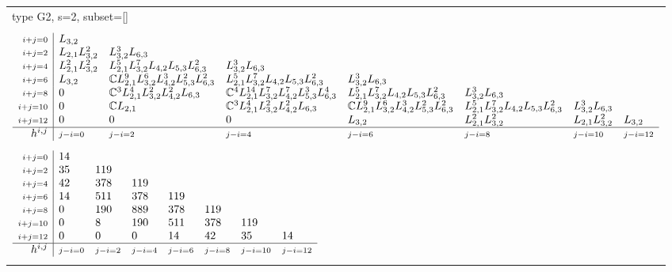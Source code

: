 \documentclass[crop,border=2mm]{standalone}
\begin{document}
\begin{tabular}{l}
{\huge type G2, s=2, subset=[]}\\ \\


$\displaystyle
\begin{array}{r|l l l l l l l}
	{\scriptstyle i+j=0}&L_{3,2}&&&&&&\\
	{\scriptstyle i+j=2}&L_{2,1}L_{3,2}^{2}&L_{3,2}^{3}L_{6,3}&&&&&\\
	{\scriptstyle i+j=4}&L_{2,1}^{2}L_{3,2}^{2}&L_{2,1}^{5}L_{3,2}^{7}L_{4,2}L_{5,3}L_{6,3}^{2}&L_{3,2}^{3}L_{6,3}&&&&\\
	{\scriptstyle i+j=6}&L_{3,2}&\mathbb{C}L_{2,1}^{9}L_{3,2}^{6}L_{4,2}^{3}L_{5,3}^{2}L_{6,3}^{2}&L_{2,1}^{5}L_{3,2}^{7}L_{4,2}L_{5,3}L_{6,3}^{2}&L_{3,2}^{3}L_{6,3}&&&\\
	{\scriptstyle i+j=8}&0&\mathbb{C}^{3}L_{2,1}^{4}L_{3,2}^{2}L_{4,2}^{2}L_{6,3}&\mathbb{C}^{4}L_{2,1}^{14}L_{3,2}^{7}L_{4,2}^{7}L_{5,3}^{3}L_{6,3}^{4}&L_{2,1}^{5}L_{3,2}^{7}L_{4,2}L_{5,3}L_{6,3}^{2}&L_{3,2}^{3}L_{6,3}&&\\
	{\scriptstyle i+j=10}&0&\mathbb{C}L_{2,1}&\mathbb{C}^{3}L_{2,1}^{4}L_{3,2}^{2}L_{4,2}^{2}L_{6,3}&\mathbb{C}L_{2,1}^{9}L_{3,2}^{6}L_{4,2}^{3}L_{5,3}^{2}L_{6,3}^{2}&L_{2,1}^{5}L_{3,2}^{7}L_{4,2}L_{5,3}L_{6,3}^{2}&L_{3,2}^{3}L_{6,3}&\\
	{\scriptstyle i+j=12}&0&0&0&L_{3,2}&L_{2,1}^{2}L_{3,2}^{2}&L_{2,1}L_{3,2}^{2}&L_{3,2}\\
	\hline h^{i,j}&{\scriptstyle j-i=0}&{\scriptstyle j-i=2}&{\scriptstyle j-i=4}&{\scriptstyle j-i=6}&{\scriptstyle j-i=8}&{\scriptstyle j-i=10}&{\scriptstyle j-i=12}
\end{array}
$ \\ \\


$\displaystyle
\begin{array}{r|l l l l l l l}
	{\scriptstyle i+j=0}&14&&&&&&\\
	{\scriptstyle i+j=2}&35&119&&&&&\\
	{\scriptstyle i+j=4}&42&378&119&&&&\\
	{\scriptstyle i+j=6}&14&511&378&119&&&\\
	{\scriptstyle i+j=8}&0&190&889&378&119&&\\
	{\scriptstyle i+j=10}&0&8&190&511&378&119&\\
	{\scriptstyle i+j=12}&0&0&0&14&42&35&14\\
	\hline h^{i,j}&{\scriptstyle j-i=0}&{\scriptstyle j-i=2}&{\scriptstyle j-i=4}&{\scriptstyle j-i=6}&{\scriptstyle j-i=8}&{\scriptstyle j-i=10}&{\scriptstyle j-i=12}
\end{array}
$ \\ \\



\end{tabular}
\end{document}
